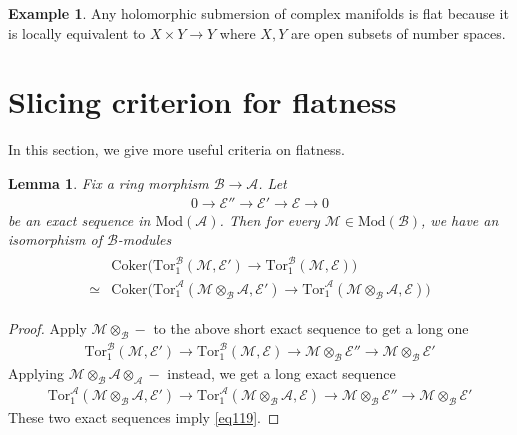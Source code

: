 \documentclass[12pt,b5paper,notitlepage]{report}
\theoremstyle{definition}
\newtheorem{eg}[df]{Example}
\theoremstyle{plain}
\newtheorem{lm}[df]{Lemma}
\newcommand{\mc}{\mathcal}
\newcommand{\Cok}{\mathrm{Coker}}
\newcommand{\Tor}{\mathrm{Tor}}
\newcommand{\Mod}{\mathrm{Mod}}
\numberwithin{equation}{section}
\begin{document}
\begin{eg}
Any holomorphic submersion of complex manifolds is flat because it is locally equivalent to $X\times Y\rightarrow Y$ where $X,Y$ are open subsets of number spaces.
\end{eg}











\section{Slicing criterion for flatness}\label{lb277}



In this section, we give more useful criteria on flatness.

\begin{lm}\label{lb261}
Fix a ring morphism $\mc B\rightarrow\mc A$. Let
\begin{align*}
0\rightarrow\mc E''\rightarrow\mc E'\rightarrow\mc E\rightarrow0
\end{align*}
be an exact sequence in $\Mod(\mc A)$. Then for every $\mc M\in\Mod(\mc B)$, we have an isomorphism of $\mc B$-modules
\begin{align}\label{eq119}
\begin{aligned}
&\Cok\Big(\Tor_1^{\mc B}(\mc M,\mc E')\rightarrow\Tor_1^{\mc B}(\mc M,\mc E) \Big)\\
\simeq&\Cok\Big(\Tor_1^{\mc A}(\mc M\otimes_{\mc B}\mc A,\mc E')\rightarrow\Tor_1^{\mc A}(\mc M\otimes_{\mc B}\mc A,\mc E) \Big)
\end{aligned}
\end{align}
\end{lm}

\begin{proof}
Apply $\mc M\otimes_{\mc B}-$ to the above short exact sequence to get a long one
\begin{align*}
\Tor_1^{\mc B}(\mc M,\mc E')\rightarrow\Tor_1^{\mc B}(\mc M,\mc E)\rightarrow\mc M\otimes_{\mc B}\mc E''\rightarrow\mc M\otimes_{\mc B}\mc E'
\end{align*}
Applying $\mc M\otimes_{\mc B}\mc A\otimes_{\mc A}-$ instead, we get a long exact sequence
\begin{align*}
\Tor_1^{\mc A}(\mc M\otimes_{\mc B}\mc A,\mc E')\rightarrow\Tor_1^{\mc A}(\mc M\otimes_{\mc B}\mc A,\mc E)\rightarrow\mc M\otimes_{\mc B}\mc E''\rightarrow\mc M\otimes_{\mc B}\mc E'
\end{align*}
These two exact sequences imply \eqref{eq119}.
\end{proof}
\end{document}

